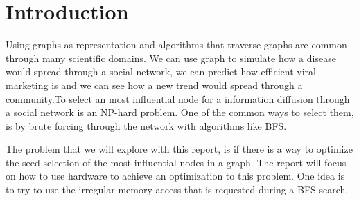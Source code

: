 \chapter{Introduction} 
Using graphs as representation and algorithms that traverse graphs are common through many scientific domains\cite{HybridBFS2015}. We can use graph to simulate how a disease would spread through a social network, we can predict how efficient viral marketing is and we can see how a new trend would spread through a community\cite{MaximizeSpread2003}.To select an most influential node for a information diffusion through a social network is an NP-hard problem\cite{MaximizeSpread2003}. One of the common ways to select them, is by brute forcing through the network with algorithms like BFS. 

The problem that we will explore with this report, is if there is a way to optimize the seed-selection of the most influential nodes in a graph. The report will focus on how to use hardware to achieve an optimization to this problem. One idea is to try to use the irregular memory access that is requested during a BFS search.